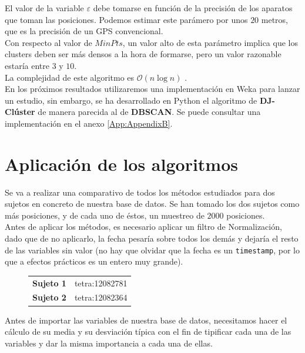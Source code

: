 \documentclass[a4paper, 12pt, spanish]{article}
\begin{document}
El valor de la variable $\varepsilon$ debe tomarse\cite{clusteringApproach} en funci\'on de la precisi\'on de los aparatos que toman las posiciones. Podemos estimar este par\'amero por unos $20$ metros, que es la precisi\'on de un GPS convencional. \\

Con respecto al valor de $MinPts$, un valor alto de esta par\'ametro implica que los clusters deben ser m\'as densos a la hora de formarse, pero un valor razonable\cite{clusteringApproach} estar\'ia entre $3$ y $10$.\\

La complejidad de este algoritmo es $\mathcal{O}(n\log{}n)$ \cite{importantPlaces}.\\

En los pr\'oximos resultados utilizaremos una implementaci\'on en Weka para lanzar un estudio, sin embargo, se ha desarrollado en Python el algoritmo de \textbf{DJ-Cl\'uster} de manera parecida al de \textbf{DBSCAN}. Se puede consultar una implementaci\'on en el anexo \ref{App:AppendixB}.


\pagebreak
\section{Aplicaci\'on de los algoritmos}


Se va a realizar una comparativo de todos los m\'etodos estudiados para dos sujetos en concreto de nuestra base de datos. Se han tomado los dos sujetos como m\'as posiciones, y de cada uno de \'estos, un muestreo de $2000$ posiciones. \\

Antes de aplicar los m\'etodos, es necesario aplicar un filtro de Normalizaci\'on, dado que de no aplicarlo, la fecha pesar\'ia sobre todos los dem\'as y dejar\'ia el resto de las variables sin valor (no hay que olvidar que la fecha es un \texttt{timestamp}, por lo que a efectos pr\'acticos es un entero muy grande). 

\begin{figure}[H]
	\begin{tabular}{| l | l |}
	\hline
		\textbf{Sujeto 1} & tetra:12082781 \\
		\textbf{Sujeto 2} & tetra:12082364 \\	
	\hline
	\end{tabular}
\end{figure}

Antes de importar las variables de nuestra base de datos, necesitamos hacer el c\'alculo de su media y su desviaci\'on t\'ipica con el fin de tipificar cada una de las variables y dar la misma importancia a cada una de ellas. \\
\end{document}
